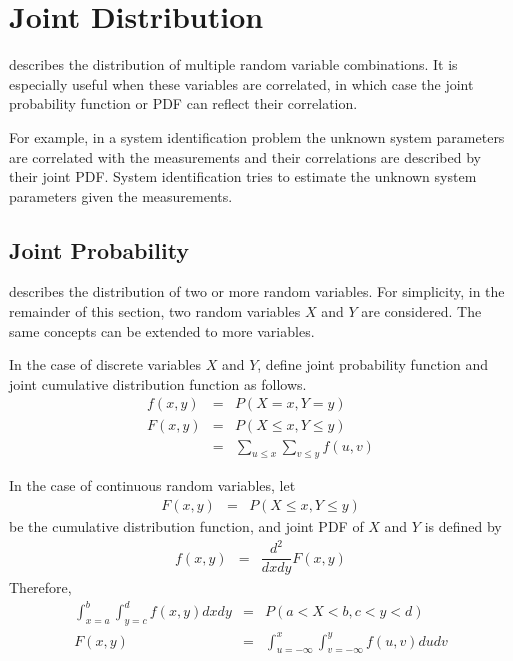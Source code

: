 \section{Joint Distribution} \label{sec:jointdistribution}

 describes the distribution of multiple random variable combinations. It is especially useful when these variables are correlated, in which case the joint probability function or PDF can reflect their correlation. 

For example, in a system identification problem the unknown system parameters are correlated with the measurements and their correlations are described by their joint PDF. System identification tries to estimate the unknown system parameters given the measurements.

\subsection{Joint Probability}

 describes the distribution of two or more random variables. For simplicity, in the remainder of this section, two random variables $X$ and $Y$ are considered. The same concepts can be extended to more variables.

In the case of discrete variables $X$ and $Y$, define joint probability function and joint cumulative distribution function as follows.
\begin{eqnarray}
	f(x, y) &=& P\left(X=x, Y=y\right) \nonumber \\
	F(x, y) &=& P\left(X\leq x, Y\leq y\right) \nonumber \\
	&=& \sum_{u\leq x}\sum_{v\leq y}f(u, v) \nonumber
\end{eqnarray}

In the case of continuous random variables, let
\begin{eqnarray}
	F(x, y) &=& P(X \leq x, Y \leq y) \nonumber
\end{eqnarray}
be the cumulative distribution function, and joint PDF of $X$ and $Y$ is defined by
\begin{eqnarray}
	f(x, y) &=& \dfrac{d^2}{dxdy}F(x, y) \nonumber
\end{eqnarray}
Therefore,
\begin{eqnarray}
	\int_{x=a}^{b}\int_{y=c}^{d} f(x, y) dxdy &=& P\left(a < X < b, c < y < d \right) \label{eq:jointpdf} \\
	F(x, y) &=& \int_{u=-\infty}^{x}\int_{v=-\infty}^{y}f(u, v)dudv \nonumber
\end{eqnarray}

